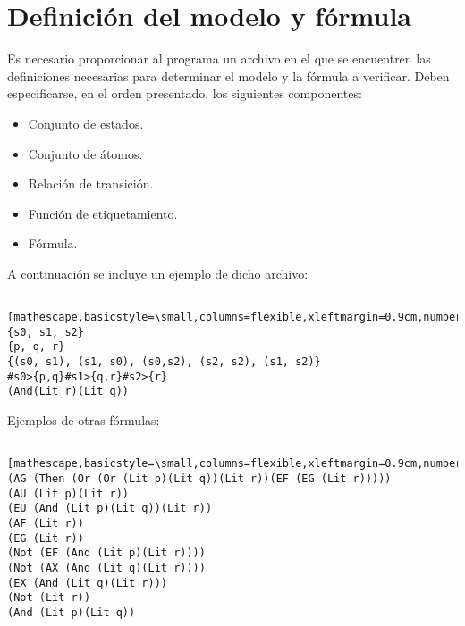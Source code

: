 \documentclass[12pt,letterpaper,spanish]{article}
\begin{document}
\section{Definición del modelo y fórmula}
Es necesario proporcionar al programa un archivo en el que se encuentren las definiciones necesarias
para determinar el modelo y la fórmula a verificar.
Deben especificarse, en el orden presentado, los siguientes componentes:
\begin{itemize}
 \item Conjunto de estados.
 \item Conjunto de átomos.
 \item Relación de transición.
 \item Función de etiquetamiento.
 \item Fórmula.
\end{itemize}
A continuación se incluye un ejemplo de dicho archivo:
\begin{lstlisting} [mathescape,basicstyle=\small,columns=flexible,xleftmargin=0.9cm,numbers=left,caption=Ejemplo,label=ejemplo,language=C++,extendedchars=true]
{s0, s1, s2}
{p, q, r}
{(s0, s1), (s1, s0), (s0,s2), (s2, s2), (s1, s2)}
#s0>{p,q}#s1>{q,r}#s2>{r}
(And(Lit r)(Lit q))
\end{lstlisting}
Ejemplos de otras fórmulas:
\begin{lstlisting} [mathescape,basicstyle=\small,columns=flexible,xleftmargin=0.9cm,numbers=left,caption=Fórmulas,label=ejemploF,language=C++,extendedchars=true]
(AG (Then (Or (Or (Lit p)(Lit q))(Lit r))(EF (EG (Lit r)))))
(AU (Lit p)(Lit r))
(EU (And (Lit p)(Lit q))(Lit r))
(AF (Lit r))
(EG (Lit r))
(Not (EF (And (Lit p)(Lit r))))
(Not (AX (And (Lit q)(Lit r))))
(EX (And (Lit q)(Lit r)))
(Not (Lit r))
(And (Lit p)(Lit q))
\end{lstlisting}
\end{document}

